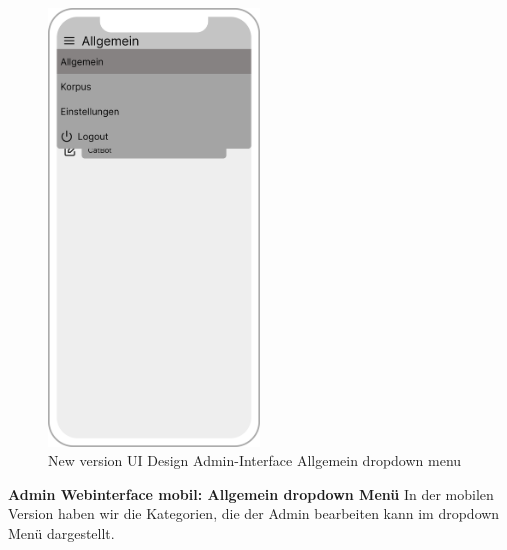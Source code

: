 \begin{figure}[H]
    \centering
    \includegraphics[width=0.5\textwidth]{bilder/new vers. UI Design/Allgemein/iPhone X Allgemein dropdown.png}
    \caption{New version UI Design Admin-Interface Allgemein dropdown menu}
    \label{fig:New version UI Design Admin-Interface Allgemein dropdown menu}
\end{figure}
\noindent \textbf{Admin Webinterface mobil: Allgemein dropdown Menü} \newline
In der mobilen Version haben wir die Kategorien, die der Admin bearbeiten kann im dropdown Menü dargestellt.

